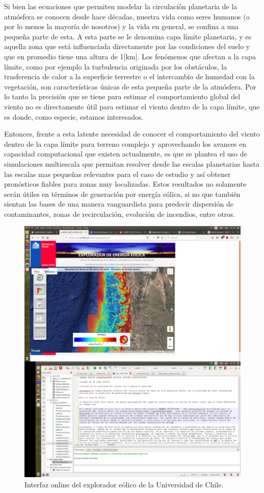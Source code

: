 Si bien las ecuaciones que permiten modelar la circulación planetaria de la atmósfera se conocen desde hace décadas, nuestra vida como seres humanos (o por lo menos la mayoría de nosotros) y la vida en general, se confina a una pequeña parte de esta. A esta parte se le denomina capa límite planetaria, y es aquella zona que está influenciada directamente por las condiciones del suelo y que en promedio tiene una altura de 1[km]. Los fenómenos que afectan a la capa límite, como por ejemplo la turbulencia originada por los obstáculos, la trasferencia de calor a la superficie terrestre o el intercambio de humedad con la vegetación, son características únicas de esta pequeña parte de la atmósfera. Por lo tanto la precisión que se tiene para estimar el comportamiento global del viento no es directamente útil para estimar el viento dentro de la capa límite, que es donde, como especie, estamos interesados. 

Entonces, frente a esta latente necesidad de conocer el comportamiento del viento dentro de la capa límite para terreno complejo y aprovechando los avances en capacidad computacional que existen actualmente, es que se plantea el uso de simulaciones multiescala que permitan resolver desde las escalas planetarias hasta las escalas mas pequeñas relevantes para el caso de estudio y así obtener pronósticos fiables para zonas muy localizadas. Estos resultados no solamente serán útiles en términos de generación por energía eólica, si no que también sientan las bases de una manera vanguardista para predecir dispersión de contaminantes, zonas de recirculación, evolución de incendios, entre otros.

\begin{figure}[h]
	\centering
	\includegraphics[width=0.9\linewidth,trim={1.4cm 28cm 15cm 3.4cm},clip]{Imagenes/01/explo}
	\caption{Interfaz online del explorador eólico de la Universidad de Chile.}
	\label{fig:01_explorador}
\end{figure}

